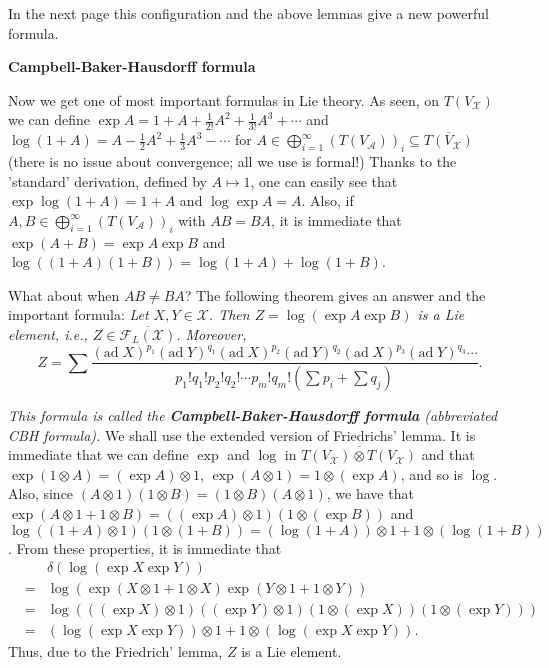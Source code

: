 \documentclass{article}
\newcommand{\ad}[1]{\mathrm{ad}\; #1}
\begin{document}
In the next page this configuration and the above lemmas give a new powerful formula.

\newpage

\textbf{Campbell-Baker-Hausdorff formula}

Now we get one of most important formulas in Lie theory.
As seen, on $T(V_\mathcal{X})$ we can define $\exp{A} = 1 + A + \frac{1}{2!} A^2 + \frac{1}{3!} A^3 + \cdots$ and $\log{(1 +A)} = A - \frac{1}{2} A^2 + \frac{1}{3} A^3 - \cdots$ for $A \in \bigoplus_{i = 1}^\infty (T(V_\mathcal{A}))_i \subseteq \overline{T(V_\mathcal{X})}$ (there is no issue about convergence; all we use is formal!)
Thanks to the 'standard' derivation, defined by $A \mapsto 1$, one can easily see that $\exp{\log{(1 + A)}} = 1 + A$ and $\log{\exp{A}} = A$.
Also, if $A, B \in \bigoplus_{i = 1}^\infty (T(V_\mathcal{A}))_i$ with $AB = BA$, it is immediate that $\exp{(A + B)} = \exp{A} \exp{B}$ and $\log{((1 + A)(1 + B))} = \log{(1 + A)} + \log{(1 + B)}$.

What about when $AB \ne BA$?
The following theorem gives an answer and the important formula: \textit{Let $X, Y \in \mathcal{X}$.
Then $Z = \log{(\exp{A} \exp{B})}$ is a Lie element, i.e., $Z \in \overline{\mathcal{F}_L(\mathcal{X})}$.
Moreover, }
\begin{displaymath}
  Z = \sum \frac{(\ad{X})^{p_1} (\ad{Y})^{q_1} (\ad{X})^{p_2} (\ad{Y})^{q_2} (\ad{X})^{p_3} (\ad{Y})^{q_3} \cdots}{p_1! q_1! p_2! q_2! \cdots p_m! q_m! (\sum p_i + \sum q_j)}.
\end{displaymath}

\textit{This formula is called the \textbf{Campbell-Baker-Hausdorff formula} (abbreviated CBH formula).}
We shall use the extended version of Friedrichs' lemma.
It is immediate that we can define $\exp$ and $\log$ in $\overline{T(V_\mathcal{X}) \otimes T(V_\mathcal{X})}$ and that $\exp{(1 \otimes A)} = (\exp{A}) \otimes 1$, $\exp{(A \otimes 1)} = 1 \otimes (\exp{A})$, and so is $\log$.
Also, since $(A \otimes 1)(1 \otimes B) = (1 \otimes B)(A \otimes 1)$, we have that $\exp{(A \otimes 1 + 1 \otimes B)} = ((\exp{A}) \otimes 1)(1 \otimes (\exp{B}))$ and $\log{((1 + A) \otimes 1)(1 \otimes (1 + B))} = (\log{(1 + A)}) \otimes 1 + 1 \otimes (\log{(1 + B)})$.
From these properties, it is immediate that
\begin{eqnarray*}
  & & \delta(\log{(\exp{X} \exp{Y})}) \\
  &=& \log{(\exp{(X \otimes 1 + 1 \otimes X)} \exp{(Y \otimes 1 + 1 \otimes Y)})} \\
  &=& \log{(((\exp{X}) \otimes 1) ((\exp{Y}) \otimes 1) (1 \otimes (\exp{X})) (1 \otimes (\exp{Y})))} \\
  &=& (\log{(\exp{X} \exp{Y})}) \otimes 1 + 1 \otimes (\log{(\exp{X} \exp{Y})}).
\end{eqnarray*}
Thus, due to the Friedrich' lemma, $Z$ is a Lie element.
\end{document}
